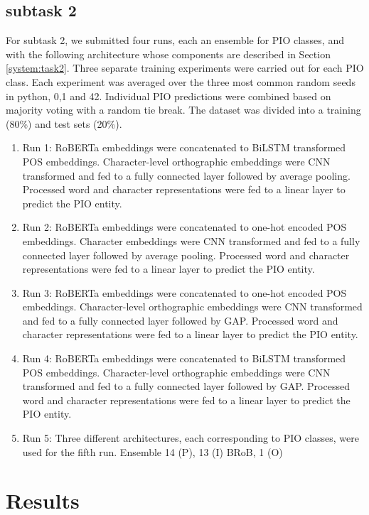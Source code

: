 \documentclass[11pt]{article}
\begin{document}
\subsection{subtask 2}
\label{exps:task2}
%
For subtask 2, we submitted four runs, each an ensemble for PIO classes, and with the following architecture whose components are described in Section \ref{system:task2}.
Three separate training experiments were carried out for each PIO class.
Each experiment was averaged over the three most common random seeds in python, 0,1 and 42.
Individual PIO predictions were combined based on majority voting with a random tie break.
The dataset was divided into a training (80\%) and test sets (20\%).
%
\begin{enumerate}
    \item Run 1: RoBERTa embeddings were concatenated to BiLSTM transformed POS embeddings. Character-level orthographic embeddings were CNN transformed and fed to a fully connected layer followed by average pooling. Processed word and character representations were fed to a linear layer to predict the PIO entity.
    \item Run 2: RoBERTa embeddings were concatenated to one-hot encoded POS embeddings. Character embeddings were CNN transformed and fed to a fully connected layer followed by average pooling. Processed word and character representations were fed to a linear layer to predict the PIO entity.
    \item Run 3: RoBERTa embeddings were concatenated to one-hot encoded POS embeddings. Character-level orthographic embeddings were CNN transformed and fed to a fully connected layer followed by GAP. Processed word and character representations were fed to a linear layer to predict the PIO entity.
    \item Run 4: RoBERTa embeddings were concatenated to BiLSTM transformed POS embeddings. Character-level orthographic embeddings were CNN transformed and fed to a fully connected layer followed by GAP. Processed word and character representations were fed to a linear layer to predict the PIO entity.
    \item Run 5: Three different architectures, each corresponding to PIO classes, were used for the fifth run. Ensemble 14 (P), 13 (I) BRoB, 1 (O)   
\end{enumerate}
%
%
%
\section{Results}
\end{document}
